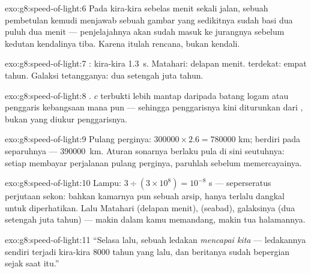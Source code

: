 \begin{solution}{exo:g8:speed-of-light:6}
Pada kira-kira sebelas menit sekali jalan, sebuah pembetulan kemudi
menjawab sebuah gambar yang sedikitnya sudah basi dua puluh dua menit
--- penjelajahnya akan sudah masuk ke jurangnya sebelum kedutan 
kendalinya tiba. Karena itulah rencana, bukan  kendali.
\end{solution}

\begin{solution}{exo:g8:speed-of-light:7}
: kira-kira \qty{1.3}{s}. Matahari: delapan menit. 
terdekat: empat tahun. Galaksi tetangganya: dua setengah juta tahun.
\end{solution}

\begin{solution}{exo:g8:speed-of-light:8}
.  $c$ terbukti lebih mantap daripada batang logam atau
penggaris kebangsaan mana pun --- sehingga penggarisnya kini
diturunkan dari , bukan  yang diukur penggarisnya.
\end{solution}

\begin{solution}{exo:g8:speed-of-light:9}
Pulang perginya: $300000 \times 2.6 = 780000$ km;  berdiri pada
separuhnya --- \qty{390000}{km}. Aturan sonarnya berlaku pula di sini
seutuhnya: setiap  membayar perjalanan pulang perginya, paruhlah
sebelum memercayainya.
\end{solution}

\begin{solution}{exo:g8:speed-of-light:10}
Lampu: $3 \div (3 \times 10^{8}) = 10^{-8}$ s --- seperseratus
perjutaan sekon: bahkan kamarnya pun sebuah arsip, hanya terlalu
dangkal untuk diperhatikan. Lalu Matahari (delapan menit), 
(seabad), galaksinya (dua setengah juta tahun) --- makin dalam kamu
memandang, makin tua halamannya.
\end{solution}

\begin{solution}{exo:g8:speed-of-light:11}
``Selasa lalu,  sebuah ledakan  \emph{mencapai kita} ---
ledakannya sendiri terjadi kira-kira $8000$ tahun yang lalu, dan
beritanya sudah bepergian sejak saat itu.''
\end{solution}


